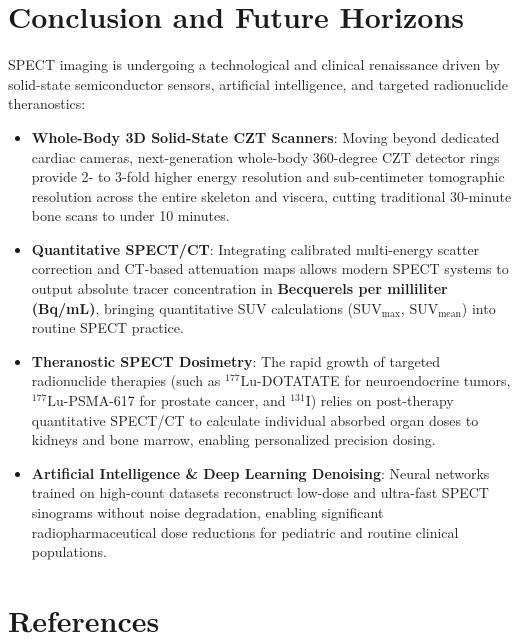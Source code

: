\documentclass[11pt,a4paper]{article}
\begin{document}
\section{Conclusion and Future Horizons}

SPECT imaging is undergoing a technological and clinical renaissance driven by solid-state semiconductor sensors, artificial intelligence, and targeted radionuclide theranostics:
\begin{itemize}[leftmargin=*]
    \item \textbf{Whole-Body 3D Solid-State CZT Scanners}: Moving beyond dedicated cardiac cameras, next-generation whole-body 360-degree CZT detector rings provide 2- to 3-fold higher energy resolution and sub-centimeter tomographic resolution across the entire skeleton and viscera, cutting traditional 30-minute bone scans to under 10 minutes.
    \item \textbf{Quantitative SPECT/CT}: Integrating calibrated multi-energy scatter correction and CT-based attenuation maps allows modern SPECT systems to output absolute tracer concentration in \textbf{Becquerels per milliliter (Bq/mL)}, bringing quantitative SUV calculations ($\text{SUV}_{\max}$, $\text{SUV}_{\text{mean}}$) into routine SPECT practice.
    \item \textbf{Theranostic SPECT Dosimetry}: The rapid growth of targeted radionuclide therapies (such as $^{177}\text{Lu}$-DOTATATE for neuroendocrine tumors, $^{177}\text{Lu}$-PSMA-617 for prostate cancer, and $^{131}\text{I}$) relies on post-therapy quantitative SPECT/CT to calculate individual absorbed organ doses to kidneys and bone marrow, enabling personalized precision dosing.
    \item \textbf{Artificial Intelligence \& Deep Learning Denoising}: Neural networks trained on high-count datasets reconstruct low-dose and ultra-fast SPECT sinograms without noise degradation, enabling significant radiopharmaceutical dose reductions for pediatric and routine clinical populations.
\end{itemize}

\section*{References}
\end{document}
